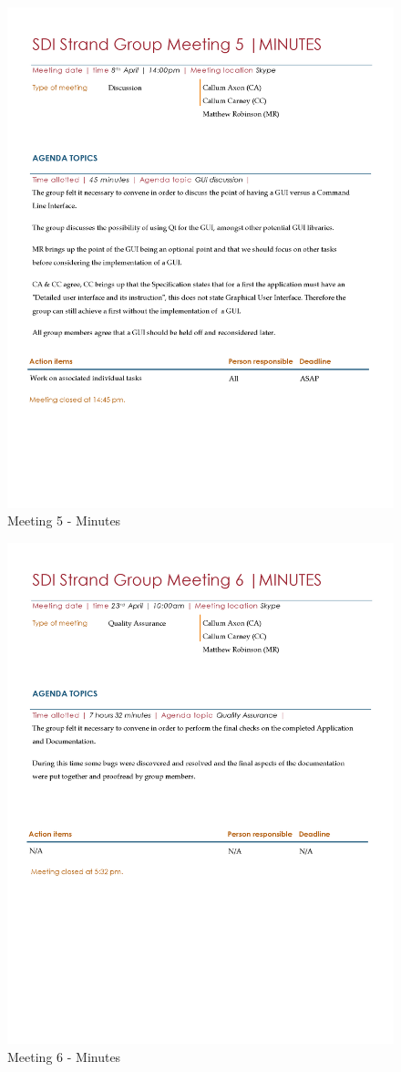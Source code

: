 \documentclass[
  english,
  a4paper,
,tablecaptionabove
]{scrartcl}
\begin{document}
\begin{figure}
\centering
\includegraphics{images/meeting-minutes/meeting-5.png}
\caption{Meeting 5 - Minutes}
\end{figure}

\begin{figure}
\centering
\includegraphics{images/meeting-minutes/meeting-6.png}
\caption{Meeting 6 - Minutes}
\end{figure}
\end{document}

